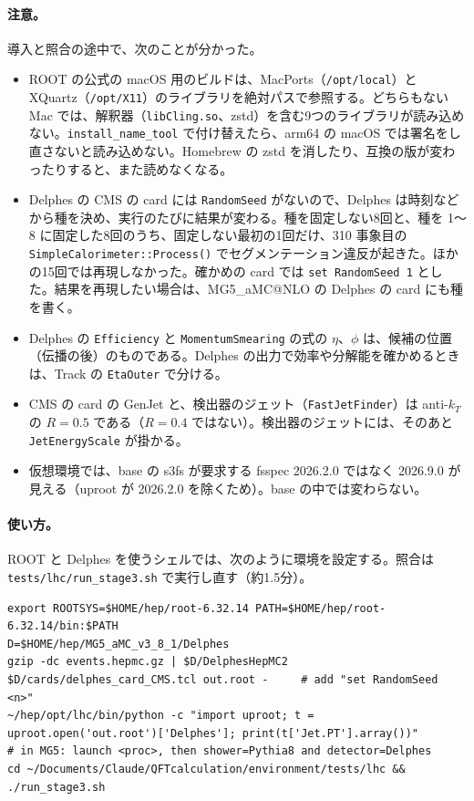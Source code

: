 \documentclass[a4paper,10pt]{ltjsarticle}
\makeatletter
\newcommand{\MGaMC}{MG5\_aMC@NLO}
\makeatother
\begin{document}
\paragraph{注意。}導入と照合の途中で、次のことが分かった。
\begin{itemize}
\item ROOT の公式の macOS 用のビルドは、MacPorts（\texttt{/opt/local}）と XQuartz（\texttt{/opt/X11}）のライブラリを絶対パスで参照する。どちらもない Mac では、解釈器（\texttt{libCling.so}、zstd）を含む9つのライブラリが読み込めない。\texttt{install\_name\_tool} で付け替えたら、arm64 の macOS では署名をし直さないと読み込めない。Homebrew の zstd を消したり、互換の版が変わったりすると、また読めなくなる。
\item Delphes の CMS の card には \texttt{RandomSeed} がないので、Delphes は時刻などから種を決め、実行のたびに結果が変わる。種を固定しない8回と、種を 1〜8 に固定した8回のうち、固定しない最初の1回だけ、310 事象目の \texttt{SimpleCalorimeter::Process()} でセグメンテーション違反が起きた。ほかの15回では再現しなかった。確かめの card では \texttt{set RandomSeed 1} とした。結果を再現したい場合は、\MGaMC{} の Delphes の card にも種を書く。
\item Delphes の \texttt{Efficiency} と \texttt{MomentumSmearing} の式の $\eta$、$\phi$ は、候補の位置（伝播の後）のものである。Delphes の出力で効率や分解能を確かめるときは、Track の \texttt{EtaOuter} で分ける。
\item CMS の card の GenJet と、検出器のジェット（\texttt{FastJetFinder}）は anti-$k_T$ の $R=0.5$ である（$R=0.4$ ではない）。検出器のジェットには、そのあと \texttt{JetEnergyScale} が掛かる。
\item 仮想環境では、base の s3fs が要求する fsspec 2026.2.0 ではなく 2026.9.0 が見える（uproot が 2026.2.0 を除くため）。base の中では変わらない。
\end{itemize}

\paragraph{使い方。}ROOT と Delphes を使うシェルでは、次のように環境を設定する。照合は \nolinkurl{tests/lhc/run_stage3.sh} で実行し直す（約1.5分）。
\begin{Verbatim}
export ROOTSYS=$HOME/hep/root-6.32.14 PATH=$HOME/hep/root-6.32.14/bin:$PATH
D=$HOME/hep/MG5_aMC_v3_8_1/Delphes
gzip -dc events.hepmc.gz | $D/DelphesHepMC2 $D/cards/delphes_card_CMS.tcl out.root -     # add "set RandomSeed <n>"
~/hep/opt/lhc/bin/python -c "import uproot; t = uproot.open('out.root')['Delphes']; print(t['Jet.PT'].array())"
# in MG5: launch <proc>, then shower=Pythia8 and detector=Delphes
cd ~/Documents/Claude/QFTcalculation/environment/tests/lhc && ./run_stage3.sh
\end{Verbatim}
\end{document}

